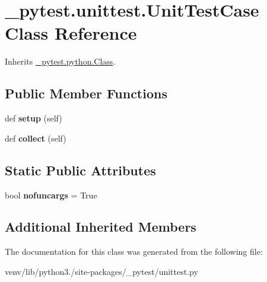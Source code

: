 \hypertarget{class__pytest_1_1unittest_1_1_unit_test_case}{}\section{\+\_\+pytest.\+unittest.\+Unit\+Test\+Case Class Reference}
\label{class__pytest_1_1unittest_1_1_unit_test_case}


Inherits \hyperlink{class__pytest_1_1python_1_1_class}{\+\_\+pytest.\+python.\+Class}.

\subsection*{Public Member Functions}
\begin{DoxyCompactItemize}
\item 
\mbox{\label{class__pytest_1_1unittest_1_1_unit_test_case_a6df042264a0e0ff92a3fea2101fb175b}} 
def {\bfseries setup} (self)
\item 
\mbox{\label{class__pytest_1_1unittest_1_1_unit_test_case_a9d9c79d955acbd2c87f6220df93cc8ac}} 
def {\bfseries collect} (self)
\end{DoxyCompactItemize}
\subsection*{Static Public Attributes}
\begin{DoxyCompactItemize}
\item 
\mbox{\label{class__pytest_1_1unittest_1_1_unit_test_case_ae097bf2f52739da20fcfce290eca758f}} 
bool {\bfseries nofuncargs} = True
\end{DoxyCompactItemize}
\subsection*{Additional Inherited Members}


The documentation for this class was generated from the following file\+:\begin{DoxyCompactItemize}
\item 
venv/lib/python3./site-\/packages/\+\_\+pytest/unittest.\+py\end{DoxyCompactItemize}
